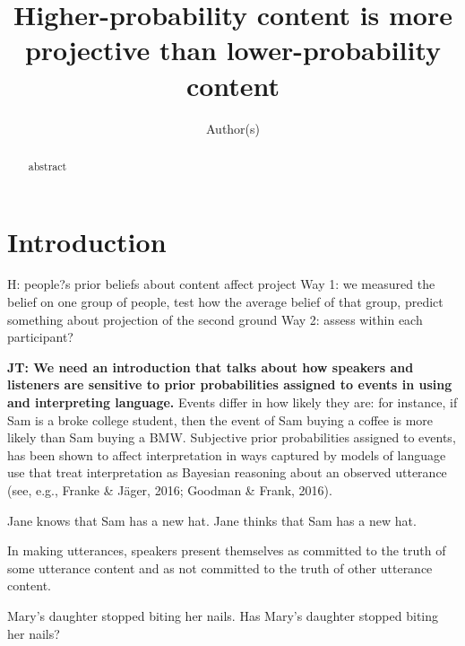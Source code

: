 \documentclass[11pt,fleqn]{article}
\title{Higher-probability content is more projective than lower-probability content}
\author{Author(s)}
\newcommand{\6}{\mbox{$[\hspace*{-.6mm}[$}}
\newcommand{\9}{\mbox{$]\hspace*{-.6mm}]$}}
\newcommand{\jt}[1]{\textbf{\color{blue}JT: #1}}
\begin{document}

\maketitle

\vspace*{-1cm}

\begin{abstract}

abstract

\end{abstract}

			
\section{Introduction}\label{s1}

H: people?s prior beliefs about content affect project
Way 1: we measured the belief on one group of people, test how the average belief of that group, predict something about projection of the second ground
Way 2: assess within each participant?

\jt{We need an introduction that talks about how speakers and listeners are sensitive to prior probabilities assigned to events in using and interpreting language.} Events differ in how likely they are: for instance, if Sam is a broke college student, then the event of Sam buying a coffee is more likely than Sam buying a BMW. Subjective prior probabilities assigned to events, has been shown to affect interpretation in ways captured by models of language use that treat interpretation as Bayesian reasoning about an observed utterance (see, e.g., Franke \& J\"ager, 2016; Goodman \& Frank, 2016).



\begin{exe}
\ex 
\begin{xlist}
\ex Jane knows that Sam has a new hat.
\ex Jane thinks that Sam has a new hat.
\end{xlist}
\end{exe}

In making utterances, speakers present themselves as committed to the truth of some utterance content and as not committed to the truth of other utterance content.

\begin{exe}
\ex
\begin{xlist}
\ex Mary's daughter stopped biting her nails.
\ex Has Mary's daughter stopped biting her nails?
\end{xlist}
\end{exe}
\end{document}
